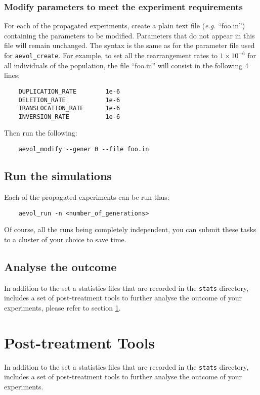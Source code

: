 \subsubsection{Modify parameters to meet the experiment requirements}
For each of the propagated experiments, create a plain text file (\emph{e.g.} ``foo.in'') containing the parameters to be modified. Parameters that do not appear in this file will remain unchanged. The syntax is the same as for the parameter file used for \verb?aevol_create?. For example, to set all the rearrangement rates to $1\times10^{-6}$ for all individuals of the population, the file ``foo.in'' will consist in the following 4 lines:
\begin{verbatim}
    DUPLICATION_RATE        1e-6
    DELETION_RATE           1e-6
    TRANSLOCATION_RATE      1e-6
    INVERSION_RATE          1e-6
\end{verbatim}
Then run the following:
\begin{verbatim}
	aevol_modify --gener 0 --file foo.in
\end{verbatim}



\subsection{Run the simulations}
Each of the propagated experiments can be run thus:
\begin{verbatim}
	aevol_run -n <number_of_generations>
\end{verbatim}
Of course, all the runs being completely independent, you can submit these tasks to a cluster of your choice to save time.


\subsection{Analyse the outcome}

In addition to the set a statistics files that are recorded in the \verb?stats? directory, \aevol{} includes a set of post-treatment tools to further analyse the outcome of your experiments, please refer to section \ref{sect:post-treatments}.


\section{Post-treatment Tools}
\label{sect:post-treatments}

In addition to the set a statistics files that are recorded in the \verb?stats? directory, \aevol{} includes a set of post-treatment tools to further analyse the outcome of your experiments.

